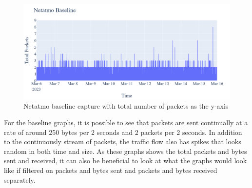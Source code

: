 \begin{figure} [H]         
    \includegraphics[scale=0.3]{figures/Netatmo_Baseline_TotalPackets.png}
    \caption{Netatmo baseline capture with total number of packets as the y-axis}
    \label{fig:NetatmoBaselineTotalPackets}
 \end{figure}

For the baseline graphs, it is possible to see that packets are sent continually at a rate of around 250 bytes per 2 seconds and 2 packets per 2 seconds. In addition to the continuously stream of packets, the traffic flow also has spikes that looks random in both time and size. As these graphs shows the total packets and bytes sent and received, it can also be beneficial to look at what the graphs would look like if filtered on packets and bytes sent and packets and bytes received separately. 

